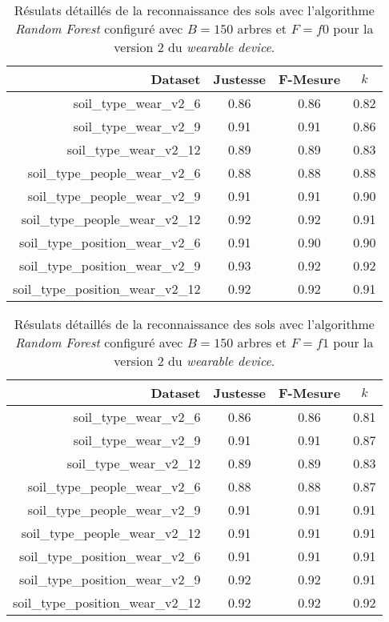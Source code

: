 \begin{table}[H]\renewcommand{\arraystretch}{0.5}
	\centering
	\caption{Résulats détaillés de la reconnaissance des sols avec l'algorithme \textit{Random Forest} configuré avec $B=150$ arbres et $F=f0$ pour la version 2 du \textit{wearable device}.}
	\label{tab:tab:rf-150-f0-wear-v2}
	\begin{tabular}{@{}rccc@{}}
		\toprule
			\textbf{Dataset} & \textbf{Justesse} & \textbf{F-Mesure} & \textbf{$k$} \\
		\midrule
			soil\_type\_wear\_v2\_6 & 0.86 & 0.86 & 0.82 \\
			soil\_type\_wear\_v2\_9 & 0.91 & 0.91 & 0.86 \\
			soil\_type\_wear\_v2\_12 & 0.89 & 0.89 & 0.83 \\
			soil\_type\_people\_wear\_v2\_6 & 0.88 & 0.88 & 0.88 \\
			soil\_type\_people\_wear\_v2\_9 & 0.91 & 0.91 & 0.90 \\
			soil\_type\_people\_wear\_v2\_12 & 0.92 & 0.92 & 0.91 \\
			soil\_type\_position\_wear\_v2\_6 & 0.91 & 0.90 & 0.90 \\
			soil\_type\_position\_wear\_v2\_9 & 0.93 & 0.92 & 0.92 \\
			soil\_type\_position\_wear\_v2\_12 & 0.92 & 0.92 & 0.91 \\
		\bottomrule
	\end{tabular}
\end{table}

\begin{table}[H]\renewcommand{\arraystretch}{0.5}
	\centering
	\caption{Résulats détaillés de la reconnaissance des sols avec l'algorithme \textit{Random Forest} configuré avec $B=150$ arbres et $F=f1$ pour la version 2 du \textit{wearable device}.}
	\label{tab:tab:rf-150-f1-wear-v2}
	\begin{tabular}{@{}rccc@{}}
		\toprule
			\textbf{Dataset} & \textbf{Justesse} & \textbf{F-Mesure} & \textbf{$k$} \\
		\midrule
			soil\_type\_wear\_v2\_6 & 0.86 & 0.86 & 0.81 \\
			soil\_type\_wear\_v2\_9 & 0.91 & 0.91 & 0.87 \\
			soil\_type\_wear\_v2\_12 & 0.89 & 0.89 & 0.83 \\
			soil\_type\_people\_wear\_v2\_6 & 0.88 & 0.88 & 0.87 \\
			soil\_type\_people\_wear\_v2\_9 & 0.91 & 0.91 & 0.91 \\
			soil\_type\_people\_wear\_v2\_12 & 0.91 & 0.91 & 0.91 \\
			soil\_type\_position\_wear\_v2\_6 & 0.91 & 0.91 & 0.91 \\
			soil\_type\_position\_wear\_v2\_9 & 0.92 & 0.92 & 0.91 \\
			soil\_type\_position\_wear\_v2\_12 & 0.92 & 0.92 & 0.92 \\
		\bottomrule
	\end{tabular}
\end{table}

